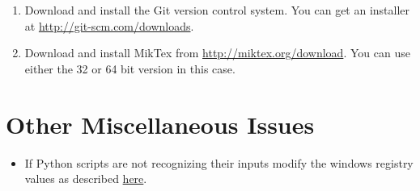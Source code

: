 \begin{enumerate}
\item Download and install the Git version control system.
You can get an installer at \url{http://git-scm.com/downloads}.

\item Download and install MikTex from \url{http://miktex.org/download}.
You can use either the 32 or 64 bit version in this case.

\end{enumerate}

\section*{Other Miscellaneous Issues}
\begin{itemize}
\item If Python scripts are not recognizing their inputs modify the windows registry values as described \href{http://stackoverflow.com/questions/2640971/windows-is-not-passing-command-line-arguments-to-python-programs-executed-from-t}{here}.
\end{itemize}
